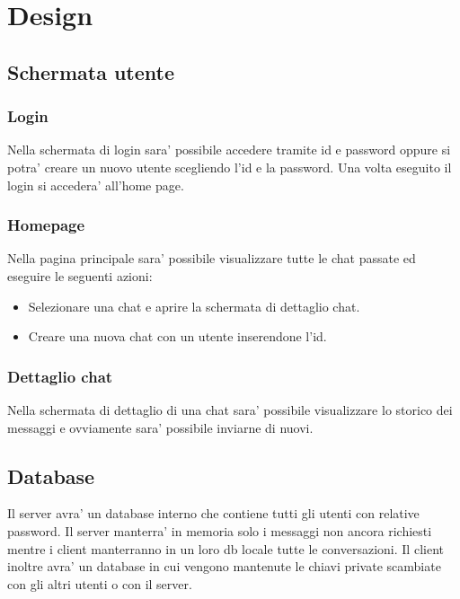 \chapter{Design}

\section{Schermata utente}

\subsection{Login}
Nella schermata di login sara' possibile accedere tramite id e password oppure si potra' creare un
nuovo utente scegliendo l'id e la password. Una volta eseguito il login si accedera' all'home page.

\subsection{Homepage}
Nella pagina principale sara' possibile visualizzare tutte le chat passate ed eseguire le seguenti
azioni:
\begin{itemize}
    \item Selezionare una chat e aprire la schermata di dettaglio chat.
    \item Creare una nuova chat con un utente inserendone l'id.
\end{itemize}

\subsection{Dettaglio chat}
Nella schermata di dettaglio di una chat sara' possibile visualizzare lo storico dei messaggi e
ovviamente sara' possibile inviarne di nuovi.

\section{Database}
Il server avra' un database interno che contiene tutti gli utenti con relative password. Il server
manterra' in memoria solo i messaggi non ancora richiesti mentre i client manterranno in un loro db
locale tutte le conversazioni.
Il client inoltre avra' un database in cui vengono mantenute le chiavi private scambiate con gli
altri utenti o con il server.
